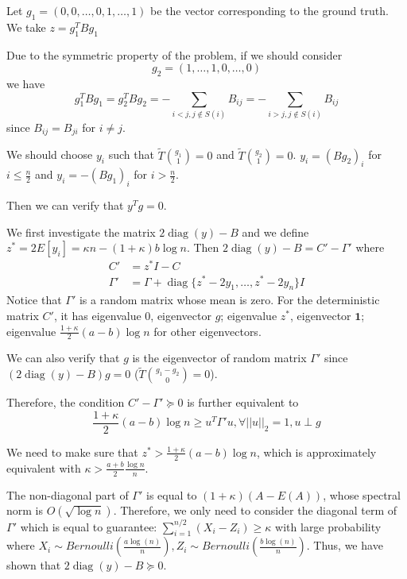 \documentclass{ctexart}
\DeclareMathOperator{\diag}{diag}
\newcommand{\A}{\frac{a \log(n)}{n}}
\newcommand{\B}{\frac{b \log(n)}{n}}
\begin{document}
Let $g_1 = (0, 0 ,\dots, 0, 1, \dots, 1)$ be the vector corresponding to the ground truth.
We take $z = g_1^T B g_1$

Due to the symmetric property of the problem, if we should consider
$$
g_2 = (1, \dots, 1 ,0, \dots, 0)
$$
we have
\begin{equation}
g_1^T B g_1 = g_2^T B g_2 = -\sum_{i<j, j \not\in S(i)} B_{ij}
= -\sum_{i>j, j \not\in S(i)} B_{ij}
\end{equation}
since $B_{ij} = B_{ji}$ for $i\neq j$.

We should choose $y_i$ such that $\widetilde{T} \binom{g_1}{1} = 0 $ and $\widetilde{T} \binom{g_2}{1} = 0$.
$y_i = (Bg_2)_i$ for $i \leq \frac{n}{2}$ 
and
$y_i = -(Bg_1)_i$ for $i > \frac{n}{2}$.

Then we can verify that $y^T  g = 0$.

We first investigate the matrix $2\diag(y) - B$ and we define $z^* = 2E[y_i]= \kappa n - (1+\kappa)b\log n$.
Then
$2\diag(y)- B = C'-\Gamma'$
where
\begin{align}
C' &= z^* I - C \\
\Gamma' & =  \Gamma +  \diag\{z^* - 2y_1, \dots, z^* - 2y_n\} I 
\end{align}
Notice that $\Gamma'$ is a random matrix whose mean is zero.
For the deterministic matrix $C'$, it has eigenvalue $0$, eigenvector $g$;
eigenvalue $z^*$, eigenvector $\mathbf{1}$; eigenvalue $\frac{1+\kappa}{2}(a-b)\log n$ for other eigenvectors.

We can also verify that $g$ is the eigenvector of random matrix $\Gamma'$ since $(2\diag(y) - B)g=0$ ($\widetilde{T} \binom{g_1 - g_2}{0} = 0$).


Therefore, the condition $C' - \Gamma' \succeq 0$ is further equivalent to
\begin{equation}\label{eq:g1}
\frac{1+\kappa}{2}(a-b)\log n \geq u^T \Gamma' u, \forall ||u||_2 = 1, u \perp g
\end{equation}

We need to make sure that $z^* > \frac{1+\kappa}{2}(a-b)\log n$, which is approximately equivalent with
$\kappa > \frac{a+b}{2} \frac{\log n}{n}$.

The non-diagonal part of $\Gamma'$ is equal to $(1+\kappa)(A-E(A))$, whose spectral norm is $O(\sqrt{\log n})$.
Therefore, we only need to consider the diagonal term of $\Gamma'$ which is equal to guarantee:
$
\sum_{i=1}^{n/2} (X_i - Z_i) \geq \kappa
$ with large probability where $X_i \sim Bernoulli(\A), Z_i \sim Bernoulli(\B)$.
Thus, we have shown that $2\diag(y) - B \succeq 0$.
\end{document}
